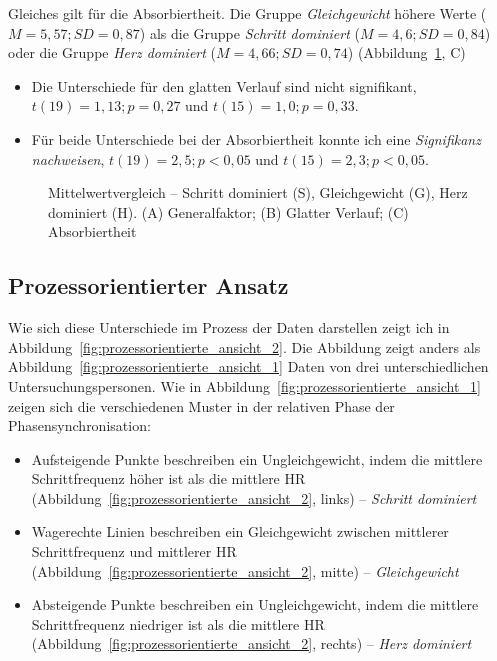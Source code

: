 Gleiches gilt für die Absorbiertheit. Die Gruppe \emph{Gleichgewicht} höhere Werte ($M = 5{,}57; SD = 0{,}87$) als die Gruppe \emph{Schritt dominiert} ($M = 4{,}6; SD = 0{,}84$) oder die Gruppe \emph{Herz dominiert} ($M = 4{,}66; SD = 0{,}74$) (Abbildung~\ref{fig:mittelwert_vergleich}, C)

\begin{itemize}

	\item Die Unterschiede für den glatten Verlauf sind nicht signifikant, $t(19) = 1{,}13; p = 0{,}27$ und $t(15) = 1{,}0; p = 0{,}33$.

	\item Für beide Unterschiede bei der Absorbiertheit konnte ich eine \emph{Signifikanz nachweisen}, $t(19) = 2{,}5; p < 0{,}05$ und $t(15) = 2{,}3; p < 0{,}05$.

\end{itemize}

\begin{figure}[thb!]
	
	\caption[Mittelwertvergleich -- Schritt dominiert, Gleichgewicht, Herz dominiert]{Mittelwertvergleich -- Schritt dominiert (S), Gleichgewicht (G), Herz dominiert (H). (A) Generalfaktor; (B) Glatter Verlauf; (C) Absorbiertheit}
	\label{fig:mittelwert_vergleich}
\end{figure}


\subsection{Prozessorientierter Ansatz} %
\label{sub:prozessorientierter_ansatz_5_3}

Wie sich diese Unterschiede im Prozess der Daten darstellen zeigt ich in Abbildung~\ref{fig:prozessorientierte_ansicht_2}. Die Abbildung zeigt anders als Abbildung~\ref{fig:prozessorientierte_ansicht_1} Daten von drei unterschiedlichen Untersuchungspersonen. Wie in Abbildung~\ref{fig:prozessorientierte_ansicht_1} zeigen sich die verschiedenen Muster in der relativen Phase der Phasensynchronisation:
\begin{itemize}
	
	\item Aufsteigende Punkte beschreiben ein Ungleichgewicht, indem die mittlere Schrittfrequenz höher ist als die mittlere \ac{HR} (Abbildung~\ref{fig:prozessorientierte_ansicht_2}, links) -- \emph{Schritt dominiert}
	
	\item Wagerechte Linien beschreiben ein Gleichgewicht zwischen mittlerer Schrittfrequenz und mittlerer \ac{HR} (Abbildung~\ref{fig:prozessorientierte_ansicht_2}, mitte) -- \emph{Gleichgewicht}
	
	\item Absteigende Punkte beschreiben ein Ungleichgewicht, indem die mittlere Schrittfrequenz niedriger ist als die mittlere \ac{HR} (Abbildung~\ref{fig:prozessorientierte_ansicht_2}, rechts) -- \emph{Herz dominiert}
\end{itemize} 


